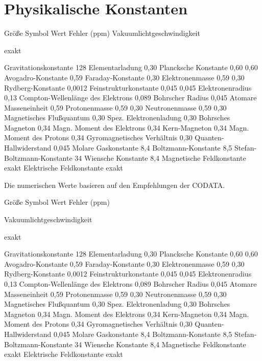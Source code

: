 
\chapter{Physikalische Konstanten}


Größe Symbol Wert Fehler (ppm) Vakuumlichtgeschwindigkeit


exakt

Gravitationskonstante
          128 Elementarladung           0,30 Plancksche Konstante           0,60             0,60 Avogadro-Konstante           0,59 Faraday-Konstante           0,30 Elektronenmasse           0,59          0,30 Rydberg-Konstante           0,0012 Feinstrukturkonstante           0,045             0,045 Elektronenradius           0,13 Compton-Wellenlänge des Elektrons           0,089 Bohrscher Radius           0,045 Atomare Masseneinheit           0,59 Protonenmasse           0,59          0,30 Neutronenmasse           0,59          0,30 Magnetisches Flußquantum           0,30 Spez. Elektronenladung           0,30 Bohrsches Magneton           0,34 Magn. Moment des Elektrons           0,34 Kern-Magneton           0,34 Magn. Moment des Protons           0,34 Gyromagnetisches Verhältnis           0,30 Quanten-Hallwiderstand           0,045 Molare Gaskonstante           8,4 Boltzmann-Konstante           8,5 Stefan-Boltzmann-Konstante           34 Wiensche Konstante           8,4 Magnetische Feldkonstante           exakt Elektrische Feldkonstante           exakt

Die numerischen Werte basieren auf den Empfehlungen der CODATA.

Größe Symbol Wert Fehler (ppm)

Vakuumlichtgeschwindigkeit


exakt

Gravitationskonstante
          128
Elementarladung           0,30 Plancksche Konstante           0,60
            0,60
Avogadro-Konstante           0,59 Faraday-Konstante           0,30
Elektronenmasse           0,59
         0,30
Rydberg-Konstante           0,0012 Feinstrukturkonstante
0,045
            0,045
Elektronenradius           0,13 Compton-Wellenlänge des Elektrons
0,089 Bohrscher Radius           0,045 Atomare Masseneinheit
0,59 Protonenmasse           0,59
         0,30
Neutronenmasse           0,59
         0,30
Magnetisches Flußquantum           0,30 Spez. Elektronenladung
0,30 Bohrsches Magneton           0,34 Magn. Moment des Elektrons
0,34 Kern-Magneton           0,34 Magn. Moment des Protons
0,34 Gyromagnetisches Verhältnis           0,30
Quanten-Hallwiderstand           0,045 Molare Gaskonstante
8,4 Boltzmann-Konstante           8,5 Stefan-Boltzmann-Konstante
34 Wiensche Konstante           8,4 Magnetische Feldkonstante
exakt Elektrische Feldkonstante           exakt



